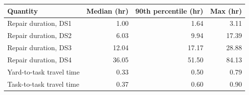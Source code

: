 \begin{tabular}{lrrr}
\toprule
Quantity & Median (hr) & 90th percentile (hr) & Max (hr) \\
\midrule
Repair duration, DS1 & 1.00 & 1.64 & 3.11 \\
Repair duration, DS2 & 6.03 & 9.94 & 17.39 \\
Repair duration, DS3 & 12.04 & 17.17 & 28.88 \\
Repair duration, DS4 & 36.05 & 51.50 & 84.13 \\
Yard-to-task travel time & 0.33 & 0.50 & 0.79 \\
Task-to-task travel time & 0.37 & 0.60 & 0.90 \\
\bottomrule
\end{tabular}
